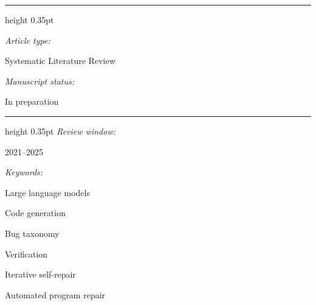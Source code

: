 \documentclass[10pt,a4paper]{article}
\newenvironment{topminipage}[1]{\begin{minipage}[t]{#1}}{\end{minipage}}
\begin{document}
\noindent
\begin{topminipage}{0.25\textwidth}
\vspace{0pt}
{\small\bfseries{}\par}
\vspace{0.45em}
\hrule height 0.35pt
\vspace{0.55em}
{\fontsize{8}{9.4}\selectfont
\textit{Article type:}\par
Systematic Literature Review\par
\vspace{0.65em}
\textit{Manuscript status:}\par
In preparation\par
\vspace{0.8em}
\hrule height 0.35pt
\vspace{0.55em}
\textit{Review window:}\par
2021--2025\par
\vspace{0.8em}
\textit{Keywords:}\par
Large language models\par
Code generation\par
Bug taxonomy\par
Verification\par
Iterative self-repair\par
Automated program repair\par}
\end{topminipage}\hfill
\end{document}

